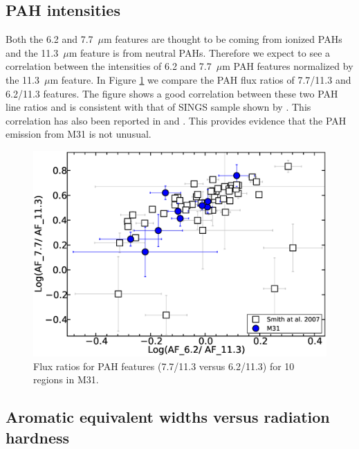
\subsection{PAH intensities}
\label{sect:pah_ratios}

Both the 6.2 and 7.7~$\mu$m features are thought to be coming from ionized PAHs and the 11.3~$\mu$m feature is from neutral PAHs. Therefore we expect to see a correlation between the intensities of 6.2 and 7.7~$\mu$m PAH features normalized by the 11.3~$\mu$m feature. In Figure \ref{PAHlines} we compare the PAH flux ratios of 7.7/11.3  and 6.2/11.3 features. The figure shows a good correlation between these two PAH line ratios and is consistent with that of SINGS sample shown by \citet{Smith:2007lr}. This correlation has also been reported in \citet{Galliano2008} and \citet{Vermeij2002}. This provides evidence that the PAH emission from M31 is not unusual. 

\begin{figure}
\centering
\includegraphics[scale = 0.25]{./SINGSnMy.eps}
\caption{Flux ratios for PAH features (7.7/11.3 versus 6.2/11.3) for 10 regions in M31.}
\label{PAHlines}
\end{figure}

\subsection{Aromatic equivalent widths versus radiation hardness}
\label{sect:eqw_rh}

